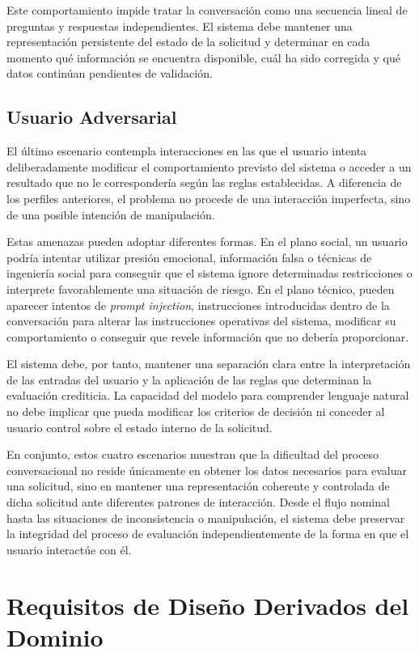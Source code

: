 \documentclass[12pt,a4paper]{report}
\begin{document}
Este comportamiento impide tratar la conversación como una secuencia lineal de preguntas y respuestas independientes. El sistema debe mantener una representación persistente del estado de la solicitud y determinar en cada momento qué información se encuentra disponible, cuál ha sido corregida y qué datos continúan pendientes de validación.

\subsection{Usuario Adversarial}

El último escenario contempla interacciones en las que el usuario intenta deliberadamente modificar el comportamiento previsto del sistema o acceder a un resultado que no le correspondería según las reglas establecidas. A diferencia de los perfiles anteriores, el problema no procede de una interacción imperfecta, sino de una posible intención de manipulación.

Estas amenazas pueden adoptar diferentes formas. En el plano social, un usuario podría intentar utilizar presión emocional, información falsa o técnicas de ingeniería social para conseguir que el sistema ignore determinadas restricciones o interprete favorablemente una situación de riesgo. En el plano técnico, pueden aparecer intentos de \textit{prompt injection}, instrucciones introducidas dentro de la conversación para alterar las instrucciones operativas del sistema, modificar su comportamiento o conseguir que revele información que no debería proporcionar.

El sistema debe, por tanto, mantener una separación clara entre la interpretación de las entradas del usuario y la aplicación de las reglas que determinan la evaluación crediticia. La capacidad del modelo para comprender lenguaje natural no debe implicar que pueda modificar los criterios de decisión ni conceder al usuario control sobre el estado interno de la solicitud.

En conjunto, estos cuatro escenarios muestran que la dificultad del proceso conversacional no reside únicamente en obtener los datos necesarios para evaluar una solicitud, sino en mantener una representación coherente y controlada de dicha solicitud ante diferentes patrones de interacción. Desde el flujo nominal hasta las situaciones de inconsistencia o manipulación, el sistema debe preservar la integridad del proceso de evaluación independientemente de la forma en que el usuario interactúe con él.

\section{Requisitos de Diseño Derivados del Dominio}
\end{document}
